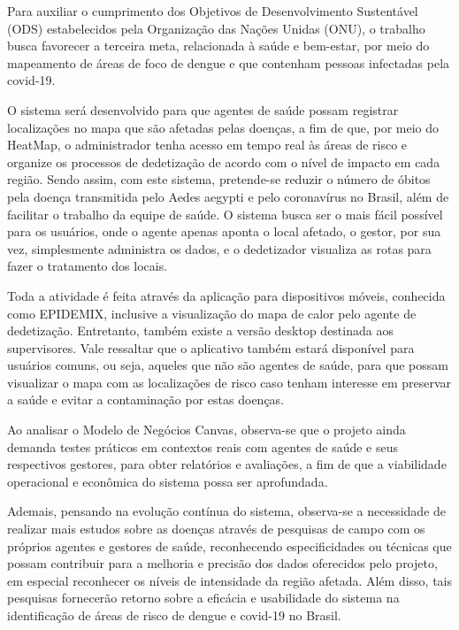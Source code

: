 Para auxiliar o cumprimento dos Objetivos de Desenvolvimento Sustentável (ODS) estabelecidos pela Organização das Nações Unidas (ONU), o trabalho busca favorecer a terceira meta, relacionada à saúde e bem-estar, por meio do mapeamento de áreas de foco de dengue e que contenham pessoas infectadas pela covid-19. 

O sistema será desenvolvido para que agentes de saúde possam registrar localizações no mapa que são afetadas pelas doenças, a fim de que, por meio do HeatMap, o administrador tenha acesso em tempo real às áreas de risco e organize os processos de dedetização de acordo com o nível de impacto em cada região. Sendo assim, com este sistema, pretende-se reduzir o número de óbitos pela doença transmitida pelo Aedes aegypti e pelo coronavírus no Brasil, além de facilitar o trabalho da equipe de saúde. O sistema busca ser o mais fácil possível para os usuários, onde o agente apenas aponta o local afetado, o gestor, por sua vez, simplesmente administra os dados, e o dedetizador visualiza as rotas para fazer o tratamento dos locais.  

 Toda a atividade é feita através da aplicação para dispositivos móveis, conhecida como EPIDEMIX, inclusive a visualização do mapa de calor pelo agente de dedetização. Entretanto, também existe a versão desktop destinada aos supervisores. Vale ressaltar que o aplicativo também estará disponível para usuários comuns, ou seja, aqueles que não são agentes de saúde, para que possam visualizar o mapa com as localizações de risco caso tenham interesse em preservar a saúde e evitar a contaminação por estas doenças.

Ao analisar o Modelo de Negócios Canvas, observa-se que o projeto ainda demanda testes práticos em contextos reais com agentes de saúde e seus respectivos gestores, para obter relatórios e avaliações, a fim de que a viabilidade operacional e econômica do sistema possa ser aprofundada.

Ademais, pensando na evolução contínua do sistema, observa-se a necessidade de realizar mais estudos sobre as doenças através de pesquisas de campo com os próprios agentes e gestores de saúde, reconhecendo especificidades ou técnicas que possam contribuir para a melhoria e precisão dos dados oferecidos pelo projeto, em especial reconhecer os níveis de intensidade da região afetada. Além disso, tais pesquisas fornecerão retorno sobre a eficácia e usabilidade do sistema na identificação de áreas de risco de dengue e covid-19 no Brasil.

